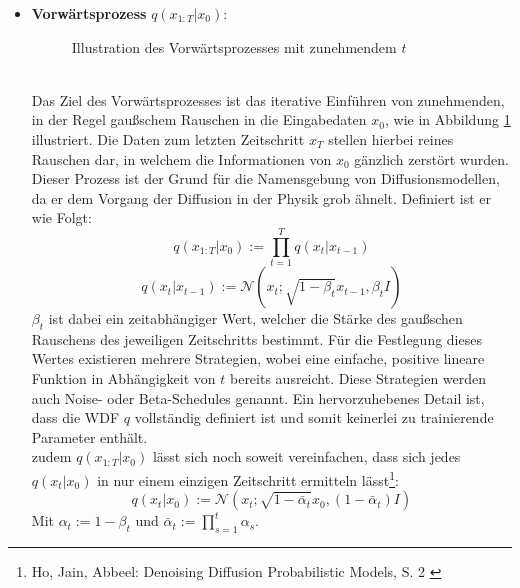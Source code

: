 \begin{itemize}
    \item \textbf{Vorwärtsprozess} $q(x_{1:T}|x_0)$: \\
    \begin{figure}[htbp]
        \centering
        \caption{Illustration des Vorwärtsprozesses mit zunehmendem $t$}
        \label{fig:forward_process}
    \end{figure} \\
    Das Ziel des Vorwärtsprozesses ist das iterative Einführen von zunehmenden, in der Regel gaußschem Rauschen in die Eingabedaten $x_0$, wie in Abbildung \ref{fig:forward_process} illustriert. Die Daten zum letzten Zeitschritt $x_T$ stellen hierbei reines Rauschen dar, in welchem die Informationen von $x_0$ gänzlich zerstört wurden. Dieser Prozess ist der Grund für die Namensgebung von Diffusionsmodellen, da er dem Vorgang der Diffusion in der Physik grob ähnelt. Definiert ist er wie Folgt:
    \begin{equation}
        q(x_{1:T}|x_0) := \prod_{t=1}^T q(x_t | x_{t-1}) 
    \end{equation}
    \begin{equation}
        q(x_t|x_{t-1}) :=  \mathcal N(x_t; \sqrt{1-\beta_t}x_{t-1}, \beta_t I)
    \end{equation}
    $\beta_t$ ist dabei ein zeitabhängiger Wert, welcher die Stärke des gaußschen Rauschens des jeweiligen Zeitschritts bestimmt. Für die Festlegung dieses Wertes existieren mehrere Strategien, wobei eine einfache, positive lineare Funktion in Abhängigkeit von $t$ bereits ausreicht. Diese Strategien werden auch Noise- oder Beta-Schedules genannt. Ein hervorzuhebenes Detail ist, dass die \ac{WDF} $q$ vollständig definiert ist und somit keinerlei zu trainierende Parameter enthält. \\
    zudem $q(x_{1:T}|x_0)$ lässt sich noch soweit vereinfachen, dass sich jedes $q(x_t|x_0)$ in nur einem einzigen Zeitschritt ermitteln lässt\footnote{
        Ho, Jain, Abbeel: Denoising Diffusion Probabilistic Models, S. 2
        \cite{ho2020denoisingdiffusionprobabilisticmodels}
    }:
    \begin{equation}
        q(x_t|x_0) :=  
        \mathcal N(x_t; \sqrt{1-\bar\alpha_t}x_0, (1 - \bar \alpha_t) I)
    \end{equation}
    Mit $\alpha_t := 1 - \beta_t$ und $\bar\alpha_t := \prod_{s=1}^t \alpha_s$.


\end{itemize}
